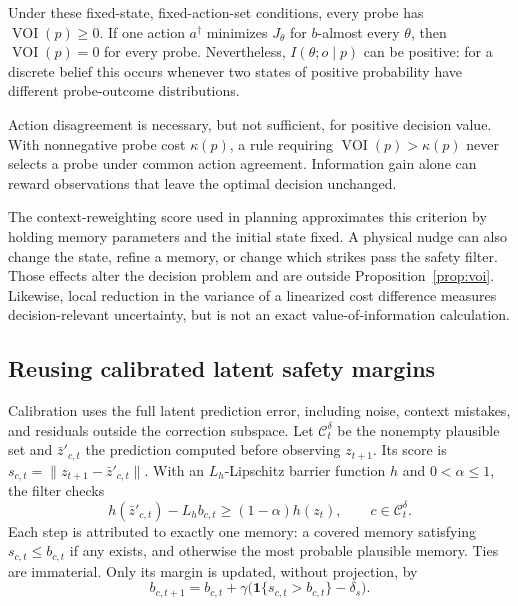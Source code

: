 \begin{proposition}\label{prop:voi}
Under these fixed-state, fixed-action-set conditions, every probe has $\operatorname{VOI}(p)\ge0$. If one action $a^\dagger$ minimizes $J_\theta$ for $b$-almost every $\theta$, then $\operatorname{VOI}(p)=0$ for every probe. Nevertheless, $I(\theta;o\mid p)$ can be positive: for a discrete belief this occurs whenever two states of positive probability have different probe-outcome distributions.
\end{proposition}
Action disagreement is necessary, but not sufficient, for positive decision value. With nonnegative probe cost $\kappa(p)$, a rule requiring $\operatorname{VOI}(p)>\kappa(p)$ never selects a probe under common action agreement. Information gain alone can reward observations that leave the optimal decision unchanged.

The context-reweighting score used in planning approximates this criterion by holding memory parameters and the initial state fixed. A physical nudge can also change the state, refine a memory, or change which strikes pass the safety filter. Those effects alter the decision problem and are outside Proposition~\ref{prop:voi}. Likewise, local reduction in the variance of a linearized cost difference measures decision-relevant uncertainty, but is not an exact value-of-information calculation.

\subsection{Reusing calibrated latent safety margins}
Calibration uses the full latent prediction error, including noise, context mistakes, and residuals outside the correction subspace. Let $\mathcal C_t^\delta$ be the nonempty plausible set and $\bar z'_{c,t}$ the prediction computed before observing $z_{t+1}$. Its score is $s_{c,t}=\|z_{t+1}-\bar z'_{c,t}\|$. With an $L_h$-Lipschitz barrier function $h$ and $0<\alpha\le1$, the filter checks
\begin{equation}\label{eq:theorysafetyconstraint}
h(\bar z'_{c,t})-L_hb_{c,t}\ge(1-\alpha)h(z_t),
\qquad c\in\mathcal C_t^\delta.
\end{equation}
Each step is attributed to exactly one memory: a covered memory satisfying $s_{c,t}\le b_{c,t}$ if any exists, and otherwise the most probable plausible memory. Ties are immaterial. Only its margin is updated, without projection, by
\begin{equation}\label{eq:theoryaci}
b_{c,t+1}=b_{c,t}+\gamma\bigl(\mathbf1\{s_{c,t}>b_{c,t}\}-\delta_s\bigr).
\end{equation}

